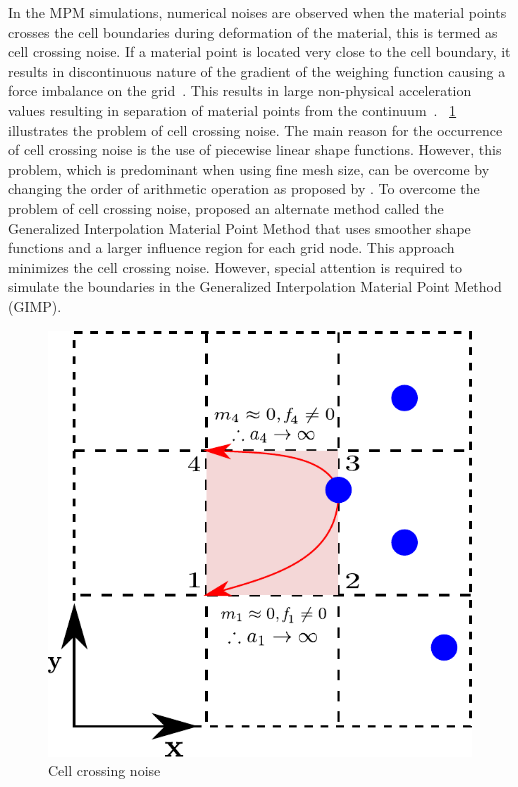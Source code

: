 In the MPM simulations, numerical noises are observed when the material points 
crosses the cell boundaries during deformation of the material, this is termed 
as cell crossing noise. If a material point is located very close to the cell 
boundary, it results in discontinuous nature of the gradient of the weighing 
function causing a force imbalance on the grid~\citep{bardenhagen2004}. This 
results in large non-physical acceleration values resulting in separation of 
material points from the continuum~\citep{Sulsky1995}. 
~\cref{fig:cellnoise} illustrates the problem of cell crossing noise. The 
main reason for the occurrence of cell crossing noise is the use of piecewise 
linear shape functions. However, this problem, which is predominant when using 
fine mesh size, can be overcome by changing the order of arithmetic operation 
as proposed by \citet{Sulsky1995}. To overcome the problem of cell crossing 
noise, \citet{bardenhagen2004} proposed an alternate method called the 
Generalized Interpolation Material Point Method that uses smoother shape 
functions and a larger influence region for each grid node. This approach 
minimizes the cell crossing noise. However, special attention is required to 
simulate the boundaries in the Generalized Interpolation Material Point Method 
(GIMP).
\begin{figure}[htbp]
\centering
\includegraphics{cellnoise}
\caption{Cell crossing noise}
\label{fig:cellnoise}
\end{figure}

